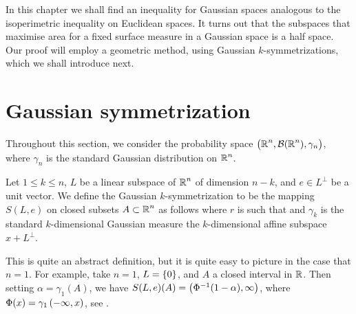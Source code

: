 \documentclass[../main.tex]{subfiles}
\begin{document}
In this chapter we shall find an inequality for Gaussian spaces analogous to the isoperimetric inequality on Euclidean spaces. It turns out that the subspaces that maximise area for a fixed surface measure in a Gaussian space is a half space. Our proof will employ a geometric method, using Gaussian $k$-symmetrizations, which we shall introduce next.

\section{Gaussian symmetrization}
Throughout this section, we consider the probability space $\del{\R^n,\Bor(\R^n),\gamma_n}$, where $\gamma_n$ is the standard Gaussian distribution on $\operatorname{\mathbb{R}}^n$.
\begin{definition}
\label{def:Gauss_symm}
Let $1\leq k\leq n$, $L$ be a linear subspace of $\operatorname{\mathbb{R}}^n$ of dimension $n-k$, and $e\in L^\perp$ be a unit vector. We define the Gaussian $k$-symmetrization to be the mapping $S(L,e)$ on closed subsets $A\subset\operatorname{\mathbb{R}}^n$ as follows  where $r$ is such that  and $\gamma_k$ is the standard $k$-dimensional Gaussian measure the $k$-dimensional affine subspace $x + L^\perp$.
\end{definition}
This is quite an abstract definition, but it is quite easy to picture in the case that $n=1$. For example, take $n=1$, $L = \cbr{0}$, and $A$ a closed interval in $\operatorname{\mathbb{R}}$. Then setting $\alpha = \gamma_1(A)$, we have $S(L,e)(A) = \intoo{\Phi^{-1}(1-\alpha),\infty}$, where $\Phi(x) = \gamma_1\intoo{-\infty,x}$, see . 
\vspace{0.5cm}
\end{document}
